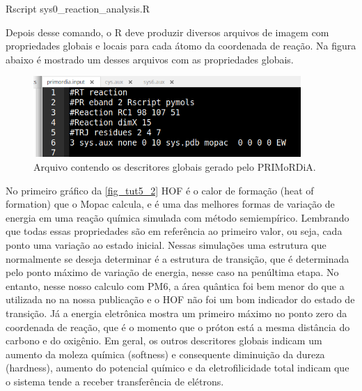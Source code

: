 \documentclass[a4paper,11pt]{refart}
\begin{document}
\hspace*{-\leftmarginwidth}
\begin{minipage}{\fullwidth}
\begin{commandshell}Rscript sys0\_reaction\_analysis.R\end{commandshell}
\end{minipage}

Depois desse comando, o R deve produzir diversos arquivos de imagem com propriedades globais e locais para cada átomo da coordenada de reação. Na figura abaixo é mostrado um desses arquivos com as propriedades globais.

\hspace*{-\leftmarginwidth}
\begin{minipage}{\fullwidth}
	\begin{figure}[H]
		\begin{center}
			\includegraphics[width=4in]{images/tut6_img1}
			\caption{Arquivo contendo os descritores globais gerado pelo PRIMoRDiA.}
			\label{fig_tut5_1}
		\end{center}
	\end{figure}
\end{minipage}

No primeiro gráfico da \autoref{fig_tut5_2} HOF é o calor de formação (heat of formation) que o Mopac calcula, e é uma das melhores formas de variação de energia em uma reação química simulada com método semiempírico. Lembrando que todas essas propriedades são em referência ao primeiro valor, ou seja, cada ponto uma variação ao estado inicial. Nessas simulações uma estrutura que normalmente se deseja determinar é a estrutura de transição, que é determinada pelo ponto máximo de variação de energia, nesse caso na penúltima etapa. No entanto, nesse nosso calculo com PM6, a área quântica foi bem menor do que a utilizada no na nossa publicação e o HOF não foi um bom indicador do estado de transição. Já a energia eletrônica mostra um primeiro máximo no ponto zero da coordenada de reação, que é o momento que o próton está a mesma distância do carbono e do oxigênio. Em geral, os outros descritores globais indicam um aumento da moleza química (softness) e consequente diminuição da dureza (hardness), aumento do potencial químico e da eletrofilicidade total indicam que o sistema tende a receber transferência de elétrons.
\end{document}
